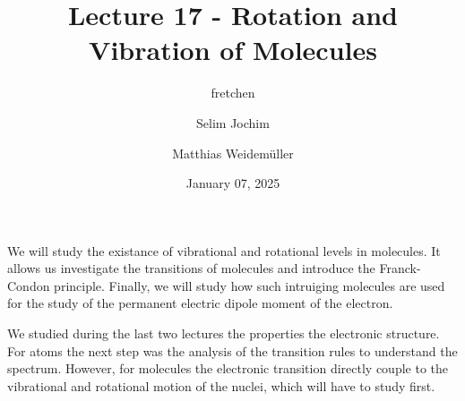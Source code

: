 \documentclass[10pt]{article}
\renewenvironment{abstract}
  {{\bfseries\noindent{\abstractname}\par\nobreak}\footnotesize}
  {\bigskip}
\begin{document}
\title{Lecture 17 - Rotation and Vibration of Molecules}



\author[1]{fretchen}%
\author[2]{Selim Jochim}%
\author[2]{Matthias Weidemüller}%
%
%


\vspace{-1em}



  
  \date{January 07, 2025}


\begingroup
\let\center\flushleft
\let\endcenter\endflushleft
\maketitle
\endgroup





\begin{abstract}
We will study the existance of vibrational and rotational levels in molecules. It allows us investigate the transitions of molecules and introduce the Franck-Condon principle. Finally, we will study how such intruiging molecules are used for the study of the permanent electric dipole moment of the electron.%
\end{abstract}%



\sloppy


We studied during the last two lectures the properties the electronic structure. For atoms the next step was the analysis of the transition rules to understand the spectrum. However, for molecules the electronic transition directly couple to the vibrational and rotational motion of the nuclei, which will have to study first.
\end{document}
